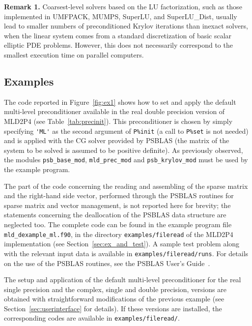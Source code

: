 \textbf{Remark 1.} Coarsest-level solvers based on the LU factorization,
such as those implemented in UMFPACK, MUMPS, SuperLU, and SuperLU\_Dist,
usually lead to smaller numbers of preconditioned Krylov
iterations than inexact solvers, when the linear system comes from
a standard discretization of basic scalar elliptic PDE problems. However,
this does not necessarily correspond to the smallest execution time
on parallel computers. 



\subsection{Examples\label{sec:examples}}

The code reported in Figure~\ref{fig:ex1} shows how to set and apply the default
multi-level preconditioner available in the real double precision version
of MLD2P4 (see Table~\ref{tab:precinit}). This preconditioner is chosen
by simply specifying \verb|'ML'| as the second argument of \verb|P%init|
(a call to \verb|P%set| is not needed) and is applied with the CG
solver provided by PSBLAS (the matrix of the system to be solved is
assumed to be positive definite). As previously observed, the modules
\verb|psb_base_mod|, \verb|mld_prec_mod| and \verb|psb_krylov_mod|
must be used by the example program.
 
The part of the code concerning the
reading and assembling of the sparse matrix and the right-hand side vector, performed
through the PSBLAS routines for sparse matrix and vector management, is not reported
here for brevity; the statements concerning the deallocation of the PSBLAS
data structure are neglected too.
The complete code can be found in the example program file \verb|mld_dexample_ml.f90|,
in the directory \verb|examples/fileread| of the MLD2P4 implementation (see
Section~\ref{sec:ex_and_test}). A sample test problem along with the relevant
input data is available in \verb|examples/fileread/runs|.
For details on the use of the PSBLAS routines, see the PSBLAS User's
Guide~\cite{PSBLASGUIDE}.

The setup and application of the default multi-level preconditioner
for the real single precision and the complex, single and double
precision, versions are obtained with straightforward modifications of the previous
example (see Section~\ref{sec:userinterface} for details). If these versions are installed,
the corresponding codes are available in \verb|examples/fileread/|.

